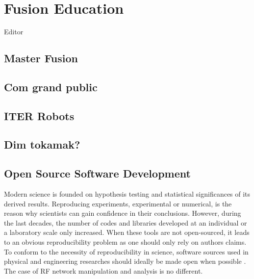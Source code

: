 \setchapterpreamble[u]{
	\dictum[R. P. Feynman] %
	{What one fool could understand, another can.}
	\margintoc
}

\chapter{Fusion Education}
Editor 


\section{Master Fusion}
\section{Com grand public}
\section{ITER Robots}
\section{Dim tokamak?}

\section{Open Source Software Development}

Modern science is founded on hypothesis testing and statistical significances of its derived results. Reproducing experiments, experimental or numerical, is the reason why scientists can gain confidence in their conclusions. However, during the last decades, the number of codes and libraries developed at an individual or a laboratory scale only increased. When these tools are not open-sourced, it leads to an obvious reproducibility problem as one should only rely on authors claims. To conform to the necessity of reproducibility in science,  software sources used in physical and engineering researches should ideally be made open when possible \cite{ince2012}. The case of RF network manipulation and analysis is no different.  

